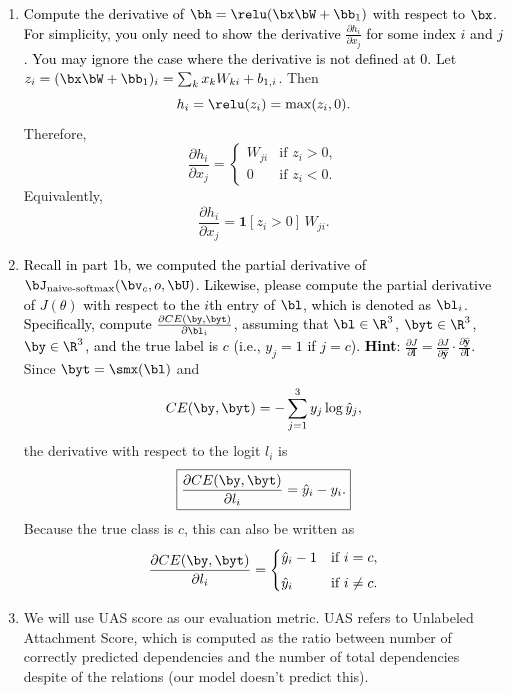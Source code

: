 \begin{parts}
\begin{enumerate}[label=\roman*.]
        \item \textcolor{black}{Compute the derivative of $\bh = \relu(\bx \bW + \bb_1)$ with respect to $\bx$. For simplicity, you only need to show the derivative $\frac{\partial h_i}{\partial x_j}$ for some index $i$ and $j$. You may ignore the case where the derivative is not defined at 0.}
        {\color{red}
        Let $z_i = (\bx\bW + \bb_1)_i = \sum_k x_k W_{ki} + b_{1,i}$. Then
        \[
        h_i = \relu(z_i) = \max(z_i, 0).
        \]
        Therefore,
        \[
        \frac{\partial h_i}{\partial x_j}
        =
        \begin{cases}
        W_{ji} & \text{if } z_i > 0,\\[4pt]
        0 & \text{if } z_i < 0.
        \end{cases}
        \]
        Equivalently,
        \[
        \boxed{\frac{\partial h_i}{\partial x_j} = \mathbf{1}[z_i > 0] \, W_{ji}.}
        \]
        }
        \item \textcolor{black}{Recall in part 1b, we computed the partial derivative of $\bJ_{\text{naive-softmax}}(\bv_c, o, \bU)$. Likewise, please compute the partial derivative of $J(\theta)$ with respect to the $i$th entry of $\bl$, which is denoted as $\bl_i$. Specifically, compute $\frac{\partial CE(\by, \byt)}{\partial \bl_i}$, assuming that $\bl \in \R^3$, $\byt \in \R^3$, $\by \in \R^3$, and the true label is $c$ (i.e., $y_j=1$ if $j=c$).
        \textbf{Hint}:  $\frac{\partial J}{\partial \mathbf{l}} = \frac{\partial J}{\partial \hat{\mathbf{y}}} \cdot \frac{\partial \hat{\mathbf{y}}}{\partial \mathbf{l}}$.}
        {\color{red}
        Since $\byt = \smx(\bl)$ and
        \[
        CE(\by, \byt) = -\sum_{j=1}^3 y_j \log \hat y_j,
        \]
        the derivative with respect to the logit $l_i$ is
        \[
        \boxed{\frac{\partial CE(\by, \byt)}{\partial l_i} = \hat y_i - y_i.}
        \]
        Because the true class is $c$, this can also be written as
        \[
        \frac{\partial CE(\by, \byt)}{\partial l_i} =
        \begin{cases}
        \hat y_i - 1 & \text{if } i=c,\\[4pt]
        \hat y_i & \text{if } i\neq c.
        \end{cases}
        \]
        }
        \item We will use UAS score as our evaluation metric. UAS refers to Unlabeled Attachment Score, which is computed as the ratio between number of correctly predicted dependencies and the number of total dependencies despite of the relations (our model doesn't predict this).\newline
    

\end{enumerate}
\end{parts}
